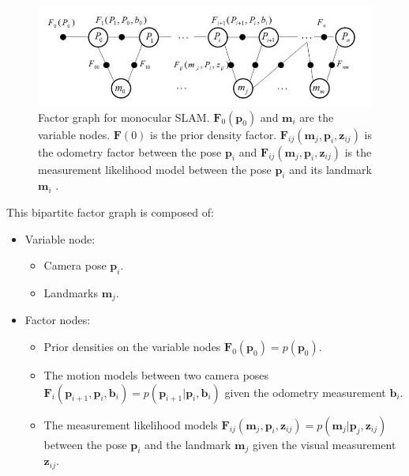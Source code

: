 \documentclass[11pt,openany]{book}
\begin{document}
\begin{figure}[H]
    \centering
    \includegraphics[scale=0.4]{assets/2_11.png}
    \caption{Factor graph for monocular SLAM. $\mathbf{F}_0(\mathbf{p}_0)$ and $\mathbf{m}_i$ are the variable nodes. $\mathbf{F}(0)$ is the prior density factor. $\mathbf{F}_{ij}(\mathbf{m}_j,\mathbf{p}_i,\mathbf{z}_{ij})$ is the odometry factor between the pose $\mathbf{p}_i$ and $\mathbf{F}_{ij}(\mathbf{m}_j,\mathbf{p}_i,\mathbf{z}_{ij})$ is the measurement likelihood model between the pose $\mathbf{p}_i$ and its landmark $\mathbf{m}_i$ .}
    \label{fig:2.11}
\end{figure}
This bipartite factor graph is composed of:
\begin{itemize}
    \item Variable node:
          \begin{itemize}
              \item Camera pose $\mathbf{p}_i$.
              \item Landmarks $\mathbf{m}_j$.
          \end{itemize}
    \item Factor nodes:
          \begin{itemize}
              \item Prior densities on the variable nodes $\mathbf{F}_0(\mathbf{p}_0)=p(\mathbf{p}_0)$.
              \item The motion models between two camera poses $\mathbf{F}_i(\mathbf{p}_{i+1},\mathbf{p}_i,\mathbf{b}_i)=p(\mathbf{p}_{i+1}|\mathbf{p}_i,\mathbf{b}_i)$ given the odometry measurement $\mathbf{b}_i$.
              \item The measurement likelihood models $\mathbf{F}_{ij}(\mathbf{m}_j,\mathbf{p}_i,\mathbf{z}_{ij})=p(\mathbf{m}_j|\mathbf{p}_j,\mathbf{z}_{ij})$ between the pose $\mathbf{p}_i$ and the landmark $\mathbf{m}_j$ given the visual measurement $\mathbf{z}_{ij}$.
          \end{itemize}
\end{itemize}
\end{document}
